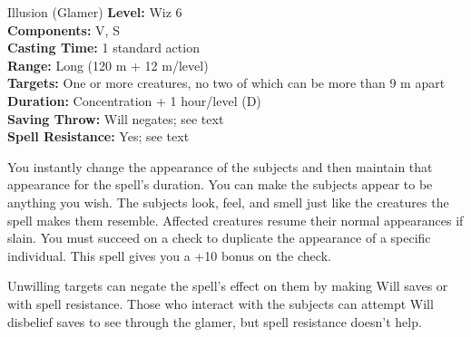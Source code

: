{Illusion (Glamer)}
{
	\textbf{Level:}
	Wiz 6\\
	\textbf{Components:}
	V, S\\
	\textbf{Casting Time:}
	1 standard action\\
	\textbf{Range:}
	Long (120 m + 12 m/level)\\
	\textbf{Targets:}
	One or more creatures, no two of which can be more than 9 m apart\\
	\textbf{Duration:}
	Concentration + 1 hour/level (D)\\
	\textbf{Saving Throw:}
	Will negates; see text\\
	\textbf{Spell Resistance:}
	Yes; see text\\
}
{
	You instantly change the appearance of the subjects and then maintain that appearance for the spell's duration. You can make the subjects appear to be anything you wish. The subjects look, feel, and smell just like the creatures the spell makes them resemble. Affected creatures resume their normal appearances if slain. You must succeed on a  check to duplicate the appearance of a specific individual. This spell gives you a +10 bonus on the check.

	Unwilling targets can negate the spell's effect on them by making Will saves or with spell resistance. Those who interact with the subjects can attempt Will disbelief saves to see through the glamer, but spell resistance doesn't help.

}
